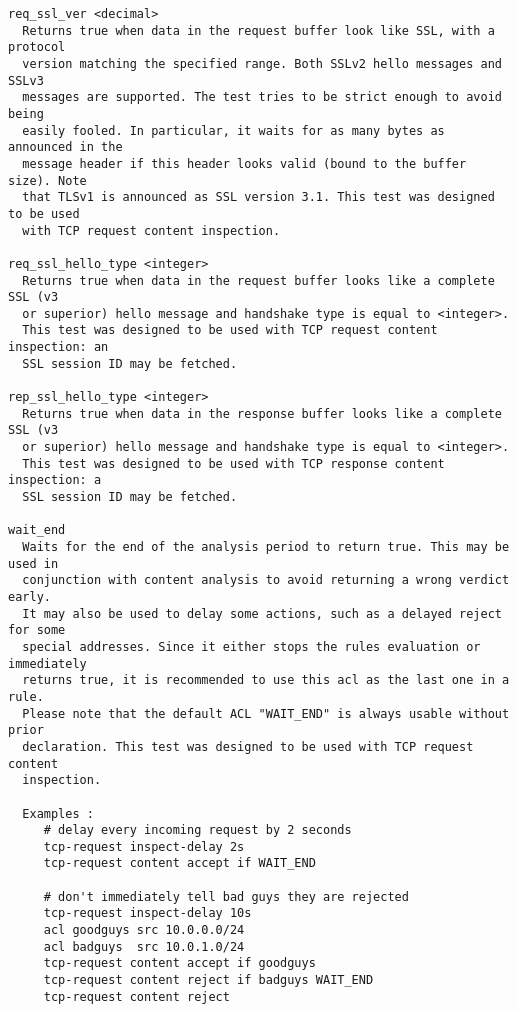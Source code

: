 \begin{verbatim}
req_ssl_ver <decimal>
  Returns true when data in the request buffer look like SSL, with a protocol
  version matching the specified range. Both SSLv2 hello messages and SSLv3
  messages are supported. The test tries to be strict enough to avoid being
  easily fooled. In particular, it waits for as many bytes as announced in the
  message header if this header looks valid (bound to the buffer size). Note
  that TLSv1 is announced as SSL version 3.1. This test was designed to be used
  with TCP request content inspection.

req_ssl_hello_type <integer>
  Returns true when data in the request buffer looks like a complete SSL (v3
  or superior) hello message and handshake type is equal to <integer>.
  This test was designed to be used with TCP request content inspection: an
  SSL session ID may be fetched.

rep_ssl_hello_type <integer>
  Returns true when data in the response buffer looks like a complete SSL (v3
  or superior) hello message and handshake type is equal to <integer>.
  This test was designed to be used with TCP response content inspection: a
  SSL session ID may be fetched.

wait_end
  Waits for the end of the analysis period to return true. This may be used in
  conjunction with content analysis to avoid returning a wrong verdict early.
  It may also be used to delay some actions, such as a delayed reject for some
  special addresses. Since it either stops the rules evaluation or immediately
  returns true, it is recommended to use this acl as the last one in a rule.
  Please note that the default ACL "WAIT_END" is always usable without prior
  declaration. This test was designed to be used with TCP request content
  inspection.

  Examples :
     # delay every incoming request by 2 seconds
     tcp-request inspect-delay 2s
     tcp-request content accept if WAIT_END

     # don't immediately tell bad guys they are rejected
     tcp-request inspect-delay 10s
     acl goodguys src 10.0.0.0/24
     acl badguys  src 10.0.1.0/24
     tcp-request content accept if goodguys
     tcp-request content reject if badguys WAIT_END
     tcp-request content reject


\end{verbatim}
